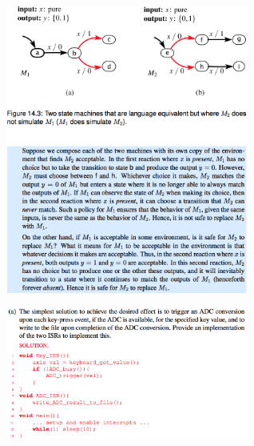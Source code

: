 \documentclass[10pt,landscape]{article}
\begin{document}
\begin{multicols}{3}
\begin{center}
\includegraphics*[width = 8cm]{Fig25.png}\\
\end{center}

\begin{center}
\includegraphics*[width = 8cm]{Fig26.png}\\
\end{center}



\end{multicols}
\end{document}
